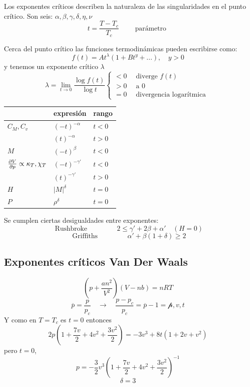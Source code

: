 \documentclass[10pt,oneside]{CBFT_book}
\begin{document}
Los exponentes críticos describen la naturaleza de las singularidades en el punto crítico.
Son seis: $ \alpha, \beta, \gamma, \delta, \eta, \nu $
\[
	t = \frac{T-T_c}{T_c} \qquad \text{ parámetro } 
\]

Cerca del punto crítico las funciones termodinámicas pueden escribirse como:
\[
	f(t) = A t^\lambda ( 1 + Bt^y + ... ), \quad y > 0 
\]
y tenemos un exponente crítico $\lambda$
\[
	\lambda = \lim_{t\to 0} \frac{\log f(t)}{\log t}  \begin{cases}
	                                                   < 0 \quad \text{ diverge }  f(t) \\
	                                                   > 0 \quad \text{ a 0 } \\
	                                                   = 0 \quad \text{ divergencia logarítmica } 
	                                                  \end{cases}
\]

\begin{center}
\begin{tabular}{lll}
 & expresión & rango \\
\hline
$C_M, C_v$ & $(-t)^{-\alpha}$ & $t < 0$  \\
 & $ (t)^{-\alpha}$ & $t > 0$\\
$M$  & $ (-t)^\beta $ & $t < 0 $ \\
$\frac{\partial^{\hspace{-0.05em}} {V}}{\partial {p}^{\hspace{-0.05em}}} \propto \kappa_T, \chi_T $ & $ (-t)^{-\gamma '}$  & $t < 0$ \\
 & $ (t)^{-\gamma'} $ & $t > 0$ \\
$H$ & $ |M|^\delta $ & $t=0$ \\
$P$ & $ \rho^\delta $ & $t=0$ 
\end{tabular}
\end{center}


Se cumplen ciertas desigualdades entre exponentes:
\[
	\text{ Rushbroke } \qquad \qquad 2 \leq \gamma ' + 2 \beta + \alpha ' \quad (H=0)  
\]
\[
	\text{ Griffiths } \qquad \qquad \alpha ' + \beta(1+\delta) \geq 2  
\]

\subsection{Exponentes críticos Van Der Waals} 

\[
	\left( p + \frac{an^2}{V^2}\right) (V-nb)= nRT
\]
\[
	\overline{p} = \frac{p}{p_c} \quad \to \quad \frac{p-p_c}{p_c} = \overline{p}-1 = \mathcal{p}, v, t
\]
Y como en $T=T_c$ es $ t = 0 $ entonces 
\[
	2p(1+\frac{7v}{2} + 4v^2 + \frac{3v^2}{2}) = -3v^3 + 8t(1+2v + v^2)
\]
pero $t=0$,
\[
	p = -\frac{3}{2} v^3 \left(1+\frac{7v}{2} + 4v^2 + \frac{3v^2}{2}\right)^{-1}
\]
\[
	\delta = 3
\]
\end{document}
